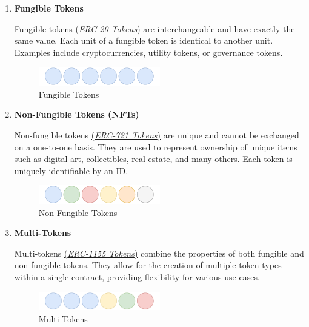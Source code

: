 \documentclass[12pt]{article}
\begin{document}
\begin{enumerate}
  \item \textbf{Fungible Tokens}

  Fungible tokens \href{https://eips.ethereum.org/EIPS/eip-20}{(\textit{ERC-20 Tokens})} are interchangeable and have exactly the same value. Each unit of a fungible token is identical to another unit. Examples include cryptocurrencies, utility tokens, or governance tokens.

    \begin{figure}[h!]
      \centering
      \includegraphics[width=0.5\textwidth]{fungible-tokens.pdf}
      \caption{Fungible Tokens}
      \label{fig:fungible-tokens}
    \end{figure}

    \item \textbf{Non-Fungible Tokens (NFTs)}

    Non-fungible tokens \href{https://eips.ethereum.org/EIPS/eip-721}{(\textit{ERC-721 Tokens})} are unique and cannot be exchanged on a one-to-one basis. They are used to represent ownership of unique items such as digital art, collectibles, real estate, and many others. Each token is uniquely identifiable by an ID.

    \begin{figure}[h!]
      \centering
      \includegraphics[width=0.5\textwidth]{non-fungible-tokens.pdf}
      \caption{Non-Fungible Tokens}
      \label{fig:non-fungible-tokens}
    \end{figure}

    \item \textbf{Multi-Tokens}

    Multi-tokens \href{https://eips.ethereum.org/EIPS/eip-1155}{(\textit{ERC-1155 Tokens})} combine the properties of both fungible and non-fungible tokens. They allow for the creation of multiple token types within a single contract, providing flexibility for various use cases.

    \begin{figure}[h!]
      \centering
      \includegraphics[width=0.5\textwidth]{multi-token.pdf}
      \caption{Multi-Tokens}
      \label{fig:multi-token}
    \end{figure}
  \end{enumerate}
\end{document}

